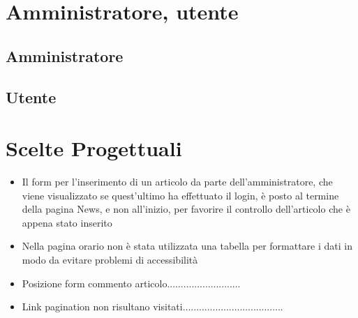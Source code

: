 \documentclass[10pt, a4paper]{article}
\begin{document}
\section{Amministratore, utente}

\subsection{Amministratore}

\subsection{Utente}

\section{Scelte Progettuali}
\begin{itemize}
	\item{Il form per l'inserimento di un articolo da parte dell'amministratore, che viene visualizzato se quest'ultimo ha effettuato il login, è posto al termine della pagina News, e non all'inizio, per favorire il controllo dell'articolo che è appena stato inserito}
	\item{Nella pagina orario non è stata utilizzata una tabella per formattare i dati in modo da evitare problemi di accessibilità}
	\item{Posizione form commento articolo...........................}
	\item{Link pagination non risultano visitati.....................................}
\end{itemize}
\end{document}
